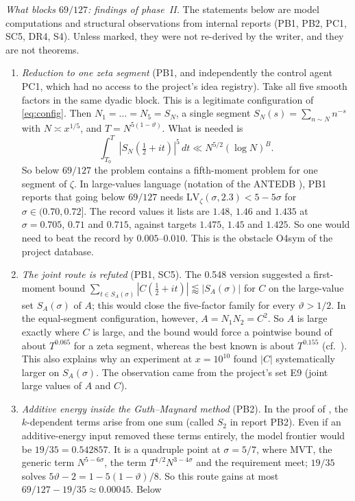 \documentclass[11pt]{amsart}
\theoremstyle{definition}
\theoremstyle{remark}
\begin{document}
\emph{What blocks $69/127$: findings of phase~II.} The statements below are model computations and structural observations from internal
reports (PB1, PB2, PC1, SC5, DR4, S4). Unless marked, they were not re-derived by the writer, and they are not theorems.
\begin{enumerate}[label=(\alph*),leftmargin=*]
\item \emph{Reduction to one zeta segment} (PB1, and independently the control agent PC1, which had no access to the project's idea registry).
Take all five smooth factors in the same dyadic block. This is a legitimate configuration of \eqref{eq:config}. Then $N_1=\dots=N_5=S_N$, a
single segment $S_N(s)=\sum_{n\sim N}n^{-s}$ with $N\asymp x^{1/5}$, and $T=N^{5(1-\vartheta)}$. What is needed is
\[
\int_{T_0}^{T}|S_N(\tfrac12+it)|^5\,dt\ll N^{5/2}(\log N)^{B}.
\]
So below $69/127$ the problem contains a fifth-moment problem for one segment of $\zeta$. In large-values language (notation of the ANTEDB \cite{TTY}), PB1
reports that going below $69/127$ needs $\mathrm{LV}_\zeta(\sigma,2.3)<5-5\sigma$ for $\sigma\in(0.70,0.72]$. The record values it lists are
$1.48$, $1.46$ and $1.435$ at $\sigma=0.705$, $0.71$ and $0.715$, against targets $1.475$, $1.45$ and $1.425$. So one would need to beat the record
by $0.005$--$0.010$. This is the obstacle O4sym of the project database.
\item \emph{The joint route is refuted} (PB1, SC5). The 0.548 version suggested a first-moment bound
$\sum_{t\in S_A(\sigma)}|C(\frac12+it)|\lessapprox|S_A(\sigma)|$ for $C$ on the large-value set $S_A(\sigma)$ of $A$; this would close the
five-factor family for every $\vartheta>1/2$. In the equal-segment configuration, however, $A=N_1N_2=C^2$. So $A$ is large exactly where $C$ is
large, and the bound would force a pointwise bound of about $T^{0.065}$ for a zeta segment, whereas the best known is about $T^{0.155}$ (cf.\
\cite{Bo}). This also explains why an experiment at $x=10^{10}$ found $|C|$ systematically larger on $S_A(\sigma)$. The observation came from
the project's set E9 (joint large values of $A$ and $C$).
\item \emph{Additive energy inside the Guth--Maynard method} (PB2). In the proof of \cite[Proposition~12.1]{GM}, the $k$-dependent terms arise
from one sum (called $S_2$ in report PB2). Even if an additive-energy input removed these terms entirely, the model frontier would be
$19/35=0.542857$. It is a quadruple point at $\sigma=5/7$, where MVT, the generic term $N^{5-6\sigma}$, the term $T^{1/2}N^{3-4\sigma}$
and the requirement meet; $19/35$ solves $5\vartheta-2=1-5(1-\vartheta)/8$. So this route gains at most $69/127-19/35\approx0.00045$. Below

\end{enumerate}
\end{document}
